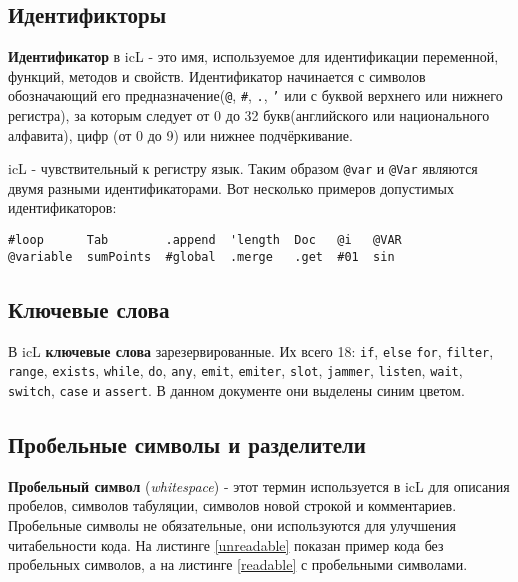 \subsection{Идентификторы}

\textbf{Идентификатор} в icL - это имя, используемое для идентификации переменной, функций, методов и свойств. Идентификатор начинается с символов обозначающий его предназначение(\texttt{@}, \texttt{#}, \texttt{.}, \texttt{'} или с буквой верхнего или нижнего регистра), за которым следует от 0 до 32 букв(английского или национального алфавита), цифр (от 0 до 9) или нижнее подчёркивание.

icL - чувствительный к регистру язык. Таким образом \texttt{@var} и \texttt{@Var} являются двумя разными идентификаторами. Вот несколько примеров допустимых идентификаторов:

\begin{verbatim}
#loop      Tab        .append  'length  Doc   @i   @VAR
@variable  sumPoints  #global  .merge   .get  #01  sin
\end{verbatim}

\subsection{Ключевые слова}

В icL \textbf{ключевые слова} зарезервированные. Их всего 18: \texttt{if}, \texttt{else} \texttt{for}, \texttt{filter}, \texttt{range}, \texttt{exists}, \texttt{while}, \texttt{do}, \texttt{any}, \texttt{emit}, \texttt{emiter}, \texttt{slot}, \texttt{jammer}, \texttt{listen}, \texttt{wait}, \texttt{switch}, \texttt{case} и \texttt{assert}. В данном документе они выделены синим цветом.

\subsection{Пробельные символы и разделители}

\textbf{Пробельный символ} (\textit{whitespace}) - этот термин используется в icL для описания пробелов, символов табуляции, символов новой строкой и комментариев. Пробельные символы не обязательные, они используются для улучшения читабельности кода. На листинге \ref{unreadable} показан пример кода без пробельных символов, а на листинге \ref{readable} с пробельными символами.


